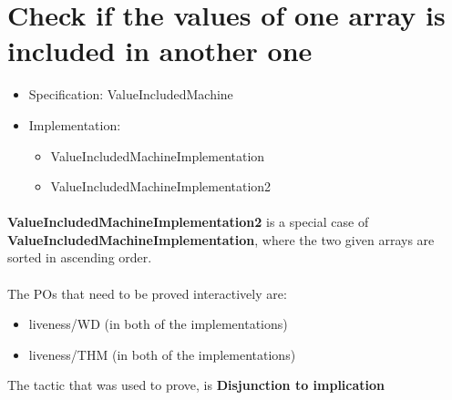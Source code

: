 \section{Check if the values of one array is included in another one}

\begin{itemize}
\item Specification: ValueIncludedMachine
\item Implementation:
\begin{itemize}
	\item ValueIncludedMachineImplementation
	\item ValueIncludedMachineImplementation2
\end{itemize}
\end{itemize}

\paragraph{}
\textbf{ValueIncludedMachineImplementation2} is a special case of \textbf{ValueIncludedMachineImplementation}, where the two given arrays are sorted in ascending order.

\paragraph{}
The POs that need to be proved interactively are:
\begin{itemize}
\item liveness/WD (in both of the implementations)
\item liveness/THM (in both of the implementations)
\end{itemize}

The tactic that was used to prove, is \textbf{Disjunction to implication}